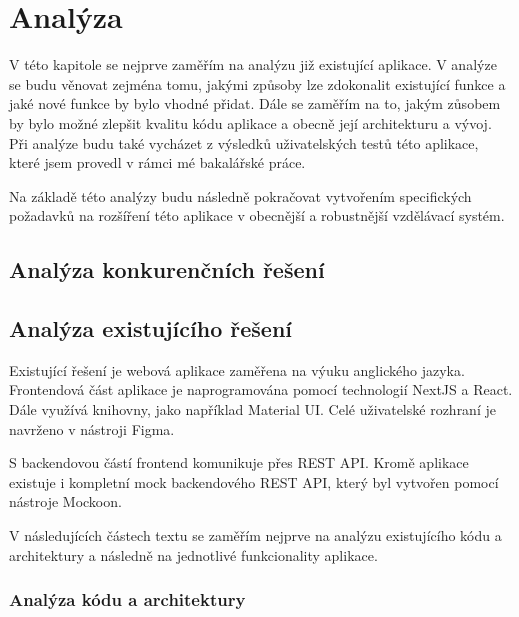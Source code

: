\chapter{Analýza}

V této kapitole se nejprve zaměřím na analýzu již existující aplikace. V analýze se budu věnovat zejména tomu, jakými způsoby lze zdokonalit existující funkce a jaké nové funkce by bylo vhodné přidat. Dále se zaměřím na to, jakým zůsobem by bylo možné zlepšit kvalitu kódu aplikace a obecně její architekturu a vývoj. Při analýze budu také vycházet z výsledků uživatelských testů této aplikace, které jsem provedl v rámci mé bakalářské práce. %


Na základě této analýzy budu následně pokračovat vytvořením specifických požadavků na rozšíření této aplikace v obecnější a robustnější vzdělávací systém.

\section{Analýza konkurenčních řešení}

\section{Analýza existujícího řešení}

Existující řešení je webová aplikace zaměřena na výuku anglického jazyka. Frontendová část aplikace je naprogramována pomocí technologií NextJS a React. Dále využívá knihovny, jako například Material UI. Celé uživatelské rozhraní je navrženo v nástroji Figma. %

S backendovou částí frontend komunikuje přes REST API. Kromě aplikace existuje i kompletní mock backendového REST API, který byl vytvořen pomocí nástroje Mockoon. %

V následujících částech textu se zaměřím nejprve na analýzu existujícího kódu a architektury a následně na jednotlivé funkcionality aplikace.

\subsection{Analýza kódu a architektury}

